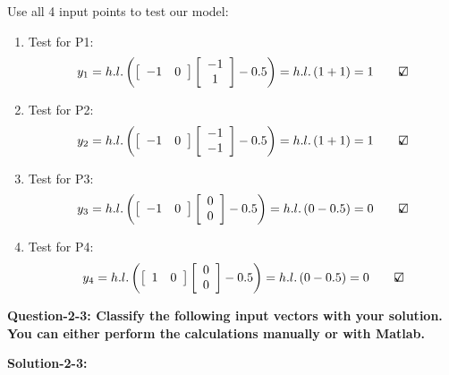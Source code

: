 \documentclass[12pt,letterpaper]{article}
\theoremstyle{definition}
\begin{document}
Use all 4 input points to test our model:
\begin{enumerate}
    \item Test for P1:
    \[{y_1} = h.l.\left( {\left[ {\begin{array}{*{20}{c}}
-1&0
\end{array}} \right]\left[ {\begin{array}{*{20}{c}}
{ - 1}\\
1
\end{array}} \right] -0.5} \right) = h.l.\left( { 1 + 1} \right) = 1 \qquad \text{\rlap{$\checkmark$}}\square\] 

\item Test for P2:
\[{y_2} = h.l.\left( {\left[ {\begin{array}{*{20}{c}}
-1&0
\end{array}} \right]\left[ {\begin{array}{*{20}{c}}
{ - 1}\\
{ - 1}
\end{array}} \right] -0.5} \right) = h.l.\left( {  1 + 1} \right) = 1\qquad \text{\rlap{$\checkmark$}}\square\] 


\item Test for P3:
\[{y_3} = h.l.\left( {\left[ {\begin{array}{*{20}{c}}
{ - 1}&0
\end{array}} \right]\left[ {\begin{array}{*{20}{c}}
0\\
0
\end{array}} \right]  - 0.5} \right) = h.l.\left( { 0 - 0.5} \right) = 0\qquad {\rlap{$\checkmark$}}\square\]

\item Test for P4:
\[{y_4} = h.l.\left( {\left[ {\begin{array}{*{20}{c}}
1&0
\end{array}} \right]\left[ {\begin{array}{*{20}{c}}
0\\
0
\end{array}} \right] - 0.5} \right) = h.l.\left( { 0 - 0.5} \right) = 0\qquad {\rlap{$\checkmark$}}\square\]
\end{enumerate}

\textbf{Question-2-3: Classify the following input vectors with your solution. You can either perform
the calculations manually or with Matlab.}


\textbf{Solution-2-3:}
\end{document}
